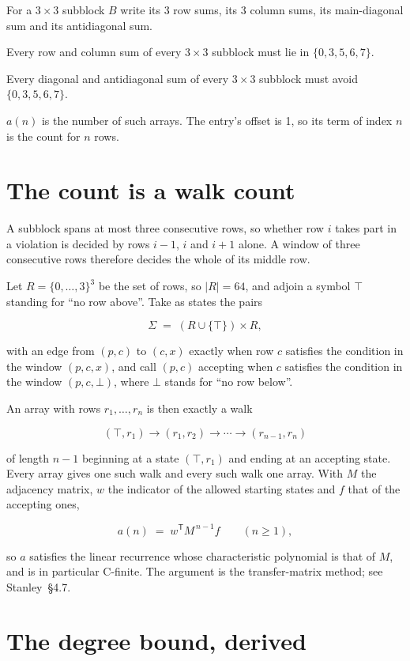 \documentclass[11pt]{article}
\theoremstyle{definition}
\begin{document}
For a $3\times3$ subblock $B$ write its 3 row sums, its 3 column sums, its main-diagonal sum and its antidiagonal sum.

Every row and column sum of every $3\times3$ subblock must lie in $\{0, 3, 5, 6, 7\}$.

Every diagonal and antidiagonal sum of every $3\times3$ subblock must avoid $\{0, 3, 5, 6, 7\}$.

$a(n)$ is the number of such arrays. The entry's offset is 1, so its term of index $n$ is the count for $n$ rows.

\section{The count is a walk count}

A subblock spans at most three consecutive rows, so whether row $i$ takes part in a violation is decided by rows $i-1$, $i$ and $i+1$ alone. A window of three consecutive rows therefore decides the whole of its middle row.

Let $R = \{0,\dots,3\}^{3}$ be the set of rows, so $|R| = 64$, and adjoin a symbol $\top$ standing for ``no row above''. Take as states the pairs

\[\Sigma \;=\; (R \cup \{\top\}) \times R,\]

with an edge from $(p,c)$ to $(c,x)$ exactly when row $c$ satisfies the condition in the window $(p,c,x)$, and call $(p,c)$ accepting when $c$ satisfies the condition in the window $(p,c,\bot)$, where $\bot$ stands for ``no row below''.

An array with rows $r_1,\dots,r_n$ is then exactly a walk

\[(\top,r_1) \to (r_1,r_2) \to \cdots \to (r_{n-1},r_n)\]

of length $n-1$ beginning at a state $(\top,r_1)$ and ending at an accepting state. Every array gives one such walk and every such walk one array. With $M$ the adjacency matrix, $w$ the indicator of the allowed starting states and $f$ that of the accepting ones,

\[a(n) \;=\; w^{\mathsf T} M^{\,n-1} f \qquad (n \ge 1),\]

so $a$ satisfies the linear recurrence whose characteristic polynomial is that of $M$, and is in particular C-finite. The argument is the transfer-matrix method; see Stanley~\S4.7.

\section{The degree bound, derived}
\end{document}
